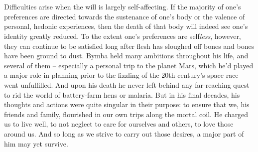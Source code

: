 \documentclass[twoside,10pt]{article}
\begin{document}
\begin{article*}
\\\\
Difficulties arise when the will is largely self-affecting. If the majority of one’s preferences are directed towards the sustenance of one’s body or the valence of personal, hedonic experiences, then the death of that body will indeed see one’s identity greatly reduced. To the extent one’s preferences are self\textit{less}, however, they can continue to be satisfied long after flesh has sloughed off bones and bones have been ground to dust. Bymba held many ambitions throughout his life, and several of them – especially a personal trip to the planet Mars, which he’d played a major role in planning prior to the fizzling of the 20th century’s space race – went unfulfilled. And upon his death he never left behind any far-reaching quest to rid the world of battery-farm hens or malaria. But in his final decades, his thoughts and actions were quite singular in their purpose: to ensure that we, his friends and family, flourished in our own trips along the mortal coil. He charged us to live well, to not neglect to care for ourselves and others, to love those around us. And so long as we strive to carry out those desires, a major part of him may yet survive.
\\


\end{article*}
\end{document}
